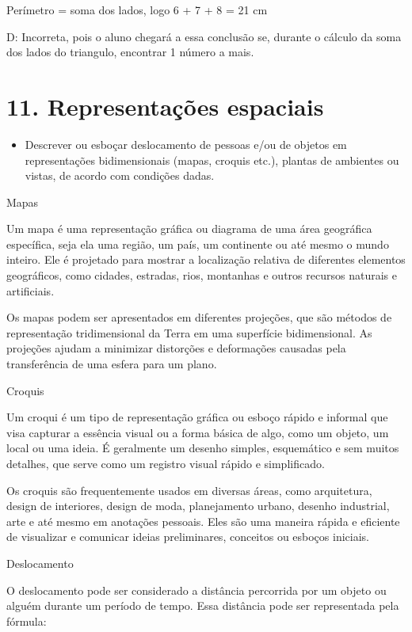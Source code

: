 Perímetro = soma dos lados, logo 6 + 7 + 8 = 21 cm

D: Incorreta, pois o aluno chegará a essa conclusão se, durante o
cálculo da soma dos lados do triangulo, encontrar 1 número a mais.


\section{11. Representações
espaciais}

\begin{itemize}
\tightlist
\item
  Descrever ou esboçar deslocamento de pessoas e/ou de objetos em
  representações bidimensionais (mapas, croquis etc.), plantas de
  ambientes ou vistas, de acordo com condições dadas.
\end{itemize}

Mapas

Um mapa é uma representação gráfica ou diagrama de uma área geográfica
específica, seja ela uma região, um país, um continente ou até mesmo o
mundo inteiro. Ele é projetado para mostrar a localização relativa de
diferentes elementos geográficos, como cidades, estradas, rios,
montanhas e outros recursos naturais e artificiais.

Os mapas podem ser apresentados em diferentes projeções, que são métodos
de representação tridimensional da Terra em uma superfície
bidimensional. As projeções ajudam a minimizar distorções e deformações
causadas pela transferência de uma esfera para um plano.

Croquis

Um croqui é um tipo de representação gráfica ou esboço rápido e informal
que visa capturar a essência visual ou a forma básica de algo, como um
objeto, um local ou uma ideia. É geralmente um desenho simples,
esquemático e sem muitos detalhes, que serve como um registro visual
rápido e simplificado.

Os croquis são frequentemente usados em diversas áreas, como
arquitetura, design de interiores, design de moda, planejamento urbano,
desenho industrial, arte e até mesmo em anotações pessoais. Eles são uma
maneira rápida e eficiente de visualizar e comunicar ideias
preliminares, conceitos ou esboços iniciais.

Deslocamento

O deslocamento pode ser considerado a distância percorrida por um objeto
ou alguém durante um período de tempo. Essa distância pode ser
representada pela fórmula:

